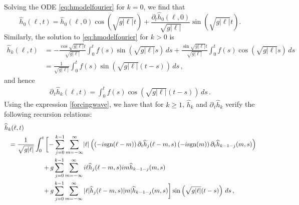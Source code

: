 \documentclass[11pt]{article}
\theoremstyle{plain}
\theoremstyle{definition}
\theoremstyle{definition}
\def\p{\text{\bf\emph{p}}}
\def\ft #1{{\widehat{#1}}}
\def\p{{\partial\hspace{1pt}}}
\begin{document}
Solving the ODE \eqref{eq:hmodelfourier}  for $k=0$, we find that
$$
\ft{h}_0(\ell,t)=\ft{h}_0(\ell,0)\cos\left(\sqrt{g|\ell|}t\right)+\frac{\partial_t\ft{h}_{0}(\ell,0)}{\sqrt{g|\ell|}}\sin\left(\sqrt{g|\ell|}t\right).
$$
Similarly, the solution to  \eqref{eq:hmodelfourier} for $k>0$ is
\begin{align*}
\ft{h}_k(\ell,t) &= - \frac{\cos \sqrt{g|\ell|} t}{\sqrt{g |\ell|}} \int_0^t f(s) \sin\left( \sqrt{g|\ell|} s\right) \,ds + \frac{\sin \sqrt{g|\ell|} t}{\sqrt{g |\ell|}} \int_0^t f(s) \cos\left( \sqrt{g|\ell|} s\right) \,ds \\
&= \frac{1}{\sqrt{g |\ell|}} \int_0^t f(s) \sin\left( \sqrt{g|\ell|} (t-s)\right) \,ds \,,
\end{align*}
and hence
\begin{align}\label{recurrence}
\p_{\!t} \ft{h}_k(\ell,t) = \int_0^t f(s) \cos\left( \sqrt{g|\ell|} (t-s)\right) \,ds\,.
\end{align}
Using the expression \eqref{forcingwave}, we have that for $k\geq1$,  $\ft{h}_k$ and $\p_{\!t} \ft{h}_k$  verify the following recursion relations:
\begin{align}
& \ft{h}_k(\ell,t) \nonumber\\
&\ \ = \frac{1}{\sqrt{g |\ell|}}\int_0^t\bigg{[}\!-\sum_{j=0}^{k-1}\sum_{m=-\infty}^{\infty}\!|\ell|\left(\left(-i\text{sgn}(\ell-m)\right)\p_{\!t}\ft{h}_{j}(\ell-m,s)\left(-i\text{sgn}(m)\right)\p_{\!t}\ft{h}_{k-1-j}(m,s)\right)\nonumber\\
&\qquad\qquad\qquad +g\sum_{j=0}^{k-1}\sum_{m=-\infty}^{\infty} i\ell\ft{h}_{j}(\ell-m,s)im \ft{h}_{k-1-j}(m,s)\nonumber\\
&\qquad\qquad\qquad +g\sum_{j=0}^{k-1}\sum_{m=-\infty}^{\infty}|\ell|\ft{h}_{j}(\ell-m,s)|m|\ft{h}_{k-1-j}(m,s)\bigg{]} \sin\left( \sqrt{g|\ell|} (t-s)\right) \,ds\,,\label{eq:recurrence}
\end{align}
\end{document}
